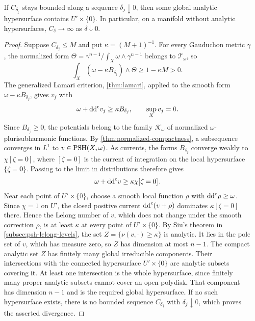 \begin{theorem}\label{thm:divisor-free-transverse-concentration}
If $C_{\delta_j}$ stays bounded along a sequence $\delta_j\downarrow0$, then some global analytic hypersurface contains $U'\times\{0\}$. In particular, on a manifold without analytic hypersurfaces, $C_\delta\to\infty$ as $\delta\downarrow0$.
\end{theorem}
\begin{proof}
Suppose $C_{\delta_j}\leq M$ and put $\kappa=(M+1)^{-1}$. For every Gauduchon metric $\gamma$, the normalized form $\Theta=\gamma^{n-1}/\int_X\omega\wedge\gamma^{n-1}$ belongs to $\mathcal T_\omega$, so
\[
 \int_X(\omega-\kappa B_{\delta_j})\wedge\Theta\geq1-\kappa M>0.
\]
The generalized Lamari criterion, \cref{thm:lamari}, applied to the smooth form $\omega-\kappa B_{\delta_j}$, gives $v_j$ with
\[
 \omega+\mathrm{dd}^{\mathrm{c}} v_j\geq\kappa B_{\delta_j},\qquad\sup_Xv_j=0.
\]
Since $B_{\delta_j}\geq0$, the potentials belong to the family $\mathcal K_\omega$ of normalized $\omega$-plurisubharmonic functions. By \cref{thm:normalized-compactness}, a subsequence converges in $L^1$ to $v\in\mathrm{PSH}(X,\omega)$.
As currents, the forms $B_{\delta_j}$ converge weakly to $\chi[\zeta=0]$, where $[\zeta=0]$ is the current of integration on the local hypersurface $\{\zeta=0\}$. Passing to the limit in distributions therefore gives
\[
 \omega+\mathrm{dd}^{\mathrm{c}} v\geq\kappa\chi[\zeta=0].
\]
Near each point of $U'\times\{0\}$, choose a smooth local function $\rho$ with $\mathrm{dd}^{\mathrm{c}}\rho\geq\omega$. Since $\chi=1$ on $U'$, the closed positive current $\mathrm{dd}^{\mathrm{c}}(v+\rho)$ dominates $\kappa[\zeta=0]$ there. Hence the Lelong number of $v$, which does not change under the smooth correction $\rho$, is at least $\kappa$ at every point of $U'\times\{0\}$.
By Siu's theorem in \cref{subsec:psh-lelong-levels}, the set $Z=\{\nu(v,\cdot)\geq\kappa\}$ is analytic. It lies in the pole set of $v$, which has measure zero, so $Z$ has dimension at most $n-1$. The compact analytic set $Z$ has finitely many global irreducible components. Their intersections with the connected hypersurface $U'\times\{0\}$ are analytic subsets covering it. At least one intersection is the whole hypersurface, since finitely many proper analytic subsets cannot cover an open polydisk. That component has dimension $n-1$ and is the required global hypersurface.
If no such hypersurface exists, there is no bounded sequence $C_{\delta_j}$ with $\delta_j\downarrow0$, which proves the asserted divergence.
\end{proof}

